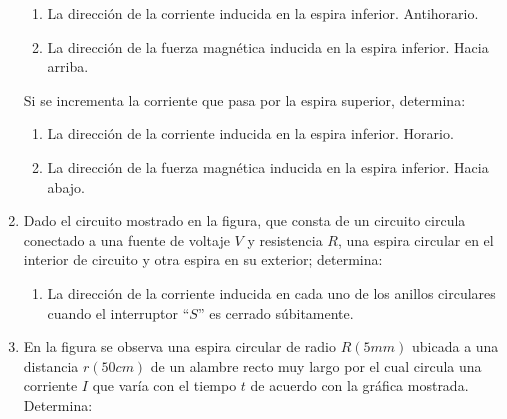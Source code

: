 \documentclass[10pt, twoside]{article}
\begin{document}
\begin{enumerate}
		\begin{enumerate}
			\item La dirección de la corriente inducida en la espira inferior.
				\subitem Antihorario.
			\item La dirección de la fuerza magnética inducida en la espira inferior.
				\subitem Hacia arriba.
		\end{enumerate}
		Si se incrementa la corriente que pasa por la espira superior, determina:
		\begin{enumerate}
			\item La dirección de la corriente inducida en la espira inferior.
				\subitem Horario.
			\item La dirección de la fuerza magnética inducida en la espira inferior.
				\subitem Hacia abajo.
		\end{enumerate}
	\setcounter{enumi}{6}
	\item Dado el circuito mostrado en la figura, que consta de un circuito
		circula conectado a una fuente de voltaje $V$ y resistencia $R$,
		una espira circular en el interior de circuito y otra espira
		en su exterior; determina:
		\begin{figure}[H]
			\centering
		\end{figure}

		\begin{enumerate}
			\item La dirección de la corriente inducida en cada uno de los
				anillos circulares cuando el interruptor ``$S$'' es
				cerrado súbitamente.
		\end{enumerate}
	\setcounter{enumi}{10}
	\item En la figura se observa una espira circular de radio $R(5mm)$ ubicada
		a una distancia $r(50cm)$ de un alambre recto muy largo por el cual
		circula una corriente $I$ que varía con el tiempo $t$ de acuerdo con
		la gráfica mostrada.
		Determina:
		\begin{figure}[H]
			\centering
			\begin{tikzpicture}[scale=1, transform shape]


\end{tikzpicture}
\end{figure}
\end{enumerate}
\end{document}
